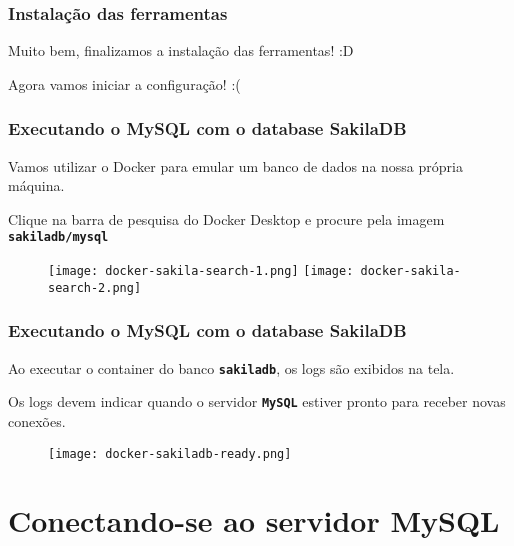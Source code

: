 \documentclass[t, 10pt, aspectratio=169, table, x11names]{beamer}
\begin{document}
	\begin{frame}
		\frametitle{Instalação das ferramentas}
		\vspace{0.5cm}
		\begin{center}
			\Large
			Muito bem, finalizamos a instalação das ferramentas! :D
		\end{center}
		\vspace{1cm}
		\begin{center}
			\LARGE
			Agora vamos iniciar a configuração! :(
		\end{center}
	\end{frame}
	
	\begin{frame}[t]
		\frametitle{Executando o MySQL com o database SakilaDB}
		Vamos utilizar o Docker para emular um banco de dados na nossa própria máquina.
		
		Clique na barra de pesquisa do Docker Desktop e procure pela imagem \textbf{\texttt{sakiladb/mysql}}
		\vspace{0.3cm}
		\begin{figure}[h]
			\texttt{[image: docker-sakila-search-1.png]}
			\hspace{0.5cm}
			\texttt{[image: docker-sakila-search-2.png]}
		\end{figure}
	\end{frame}
	
	\begin{frame}[t]
		\frametitle{Executando o MySQL com o database SakilaDB}
		Ao executar o container do banco \textbf{\texttt{sakiladb}}, os logs são exibidos na tela.
		
		Os logs devem indicar quando o servidor \texttt{\textbf{MySQL}} estiver pronto para receber novas conexões.
		\vspace{0.1cm}
		\begin{figure}[h]
			\texttt{[image: docker-sakiladb-ready.png]}
		\end{figure}
	\end{frame}

	\section{Conectando-se ao servidor MySQL}
\end{document}
